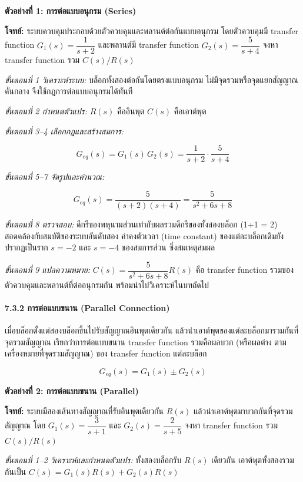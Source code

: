 \textbf{ตัวอย่างที่ 1: การต่อแบบอนุกรม (Series)}

\textbf{โจทย์:} ระบบควบคุมประกอบด้วยตัวควบคุมและพลานต์ต่อกันแบบอนุกรม โดยตัวควบคุมมี transfer function $G_1(s) = \dfrac{1}{s+2}$ และพลานต์มี transfer function $G_2(s) = \dfrac{5}{s+4}$ จงหา transfer function รวม $C(s)/R(s)$

\textit{ขั้นตอนที่ 1 วิเคราะห์ระบบ:} บล็อกทั้งสองต่อกันโดยตรงแบบอนุกรม ไม่มีจุดรวมหรือจุดแยกสัญญาณคั่นกลาง จึงใช้กฎการต่อแบบอนุกรมได้ทันที

\textit{ขั้นตอนที่ 2 กำหนดตัวแปร:} $R(s)$ คืออินพุต $C(s)$ คือเอาต์พุต

\textit{ขั้นตอนที่ 3–4 เลือกกฎและสร้างสมการ:}

\[
G_{eq}(s) = G_1(s)\,G_2(s) = \frac{1}{s+2}\cdot\frac{5}{s+4}
\]

\textit{ขั้นตอนที่ 5–7 จัดรูปและคำนวณ:}

\[
G_{eq}(s) = \frac{5}{(s+2)(s+4)} = \frac{5}{s^2+6s+8}
\]

\textit{ขั้นตอนที่ 8 ตรวจสอบ:} ดีกรีของพหุนามส่วนเท่ากับผลรวมดีกรีของทั้งสองบล็อก (1+1 = 2) สอดคล้องกับสมบัติของระบบอันดับสอง ค่าคงตัวเวลา (time constant) ของแต่ละบล็อกเดิมยังปรากฏเป็นราก $s=-2$ และ $s=-4$ ของสมการส่วน ซึ่งสมเหตุสมผล

\textit{ขั้นตอนที่ 9 แปลความหมาย:} $C(s) = \dfrac{5}{s^2+6s+8}R(s)$ คือ transfer function รวมของตัวควบคุมและพลานต์ที่ต่ออนุกรมกัน พร้อมนำไปวิเคราะห์ในบทถัดไป

\paragraph{7.3.2 การต่อแบบขนาน (Parallel Connection)}

เมื่อบล็อกตั้งแต่สองบล็อกขึ้นไปรับสัญญาณอินพุตเดียวกัน แล้วนำเอาต์พุตของแต่ละบล็อกมารวมกันที่จุดรวมสัญญาณ เรียกว่าการต่อแบบขนาน transfer function รวมคือผลบวก (หรือผลต่าง ตามเครื่องหมายที่จุดรวมสัญญาณ) ของ transfer function แต่ละบล็อก

\[
G_{eq}(s) = G_1(s) \pm G_2(s)
\]

\textbf{ตัวอย่างที่ 2: การต่อแบบขนาน (Parallel)}

\textbf{โจทย์:} ระบบมีสองเส้นทางสัญญาณที่รับอินพุตเดียวกัน $R(s)$ แล้วนำเอาต์พุตมาบวกกันที่จุดรวมสัญญาณ โดย $G_1(s) = \dfrac{3}{s+1}$ และ $G_2(s) = \dfrac{2}{s+5}$ จงหา transfer function รวม $C(s)/R(s)$

\textit{ขั้นตอนที่ 1–2 วิเคราะห์และกำหนดตัวแปร:} ทั้งสองบล็อกรับ $R(s)$ เดียวกัน เอาต์พุตทั้งสองรวมกันเป็น $C(s) = G_1(s)R(s) + G_2(s)R(s)$

